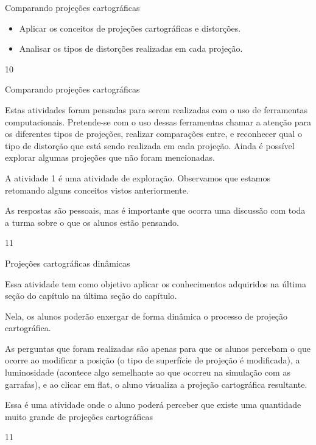 \begin{ObjetivoEsp}{Comparando projeções cartográficas}
{
  \begin{itemize}
  \item Aplicar os conceitos de projeções cartográficas e distorções.
  \item Analisar os tipos de distorções realizadas em cada projeção.
  \end{itemize}
}{1}{0}
\end{ObjetivoEsp}
\clearmargin
\begin{Recomenda}{Comparando projeções cartográficas}
{
  Estas atividades foram pensadas para serem realizadas com o uso de ferramentas computacionais. Pretende-se com o uso dessas ferramentas chamar a atenção para os diferentes tipos de projeções, realizar comparações entre, e reconhecer qual o tipo de distorção que está sendo realizada em cada projeção. Ainda é possível explorar algumas projeções que não foram mencionadas.

  A atividade 1 é uma atividade de exploração. Observamos que estamos retomando alguns conceitos vistos anteriormente.

  As respostas são pessoais, mas é importante que ocorra uma discussão com toda a turma sobre o que os alunos estão pensando.
}{1}{1}
\end{Recomenda}
\begin{ObjetivoEsp}{Projeções cartográficas dinâmicas}
{
  Essa atividade tem como objetivo aplicar os conhecimentos adquiridos na última seção do capítulo na última seção do capítulo.

  Nela, os alunos poderão enxergar de forma dinâmica o processo de projeção cartográfica.

  As perguntas que foram realizadas são apenas para que os alunos percebam o que ocorre ao modificar a posição (o tipo de superfície de projeção é modificada), a luminosidade (acontece algo semelhante ao que ocorreu na simulação com as garrafas), e ao clicar em flat, o aluno visualiza a projeção cartográfica resultante.

  Essa é uma atividade onde o aluno poderá perceber que existe uma quantidade muito grande de projeções cartográficas
}{1}{1}
\end{ObjetivoEsp}

